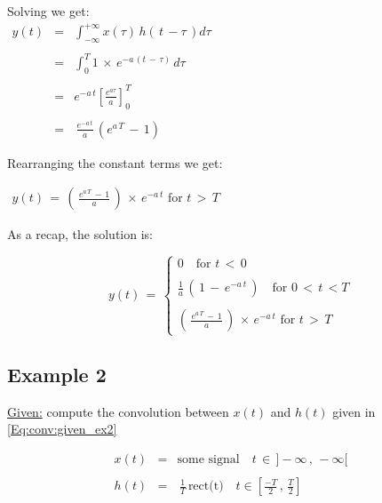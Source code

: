 \begin{itemize}
\begin{enumerate}
Solving we get:\\

$\begin{array}{rcl}
y(t) &=& \displaystyle \int_{-\infty}^{+\infty} x(\tau) \, h\left(\,t \, - \tau\, \right) d \tau  \\ \\
    &=& \displaystyle \int_{0}^{T}  1 \, \times \, e^{-a \, (t \, - \, \tau)} \, d \tau \\ \\
    &=& e^{-a \, t}  \left[ \displaystyle\frac{e^{a\tau}}{a} \right]_{0}^{T} \\ \\ 
    &=& \, \displaystyle\frac{e^{-a \, t}}{a} \, (e^{a \, T} \, - \, 1)
\end{array}$

Rearranging the constant terms we get:


$\begin{array}{rcl}
y(t) \, = \, \left(\, \displaystyle\frac{e^{a \, T} \, - \, 1}{a} \,\right) \, \times \, e^{-a \, t} \text{ for } t \, > \, T
\end{array}$    
    \end{enumerate}

    
\end{itemize}

As a recap, the solution is:

\begin{equation}
y(t) \, = \, 
\begin{cases}
       0 \quad \text{for } t \, < \, 0  \\ \\
        \displaystyle\frac{1}{a} \, \left(\, 1 \, - \, e^{-a \, t}   \, \right) \quad \text{for } 0 \, < \, t \, < T \\ \\
        \left(\, \displaystyle\frac{e^{a \, T} \, - \, 1}{a} \,\right) \, \times \, e^{-a \, t} \text{ for } t \, > \, T
\end{cases} 
\end{equation}



\newpage
\subsection{Example 2}

\underline{Given:} compute the convolution between $x(t)$ and $h(t)$ given in \autoref{Eq:conv:given_ex2}

\begin{equation}
\begin{array}{rcl}
     x(t) &=& \text{some signal}  \quad t \, \in \, ]- \infty \, ,\, - \infty  [   \\ \\
    h(t) &=& \,  \displaystyle\frac{1}{T} \, \text{rect(t)} \quad t \in \left[ \displaystyle\frac{-T}{2} \, , \, \displaystyle\frac{T}{2}  \right]
\end{array}
\label{Eq:conv:given_ex2}
\end{equation}




